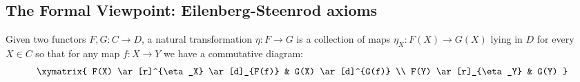 \subsection{The Formal Viewpoint: Eilenberg-Steenrod axioms}
\begin{defn}\label{defn-natural-transformation}
	Given two functors $F, G : C \to D$, a natural transformation $\eta : F \to G$ is a collection of maps $\eta_X : F(X) \to G(X)$ lying in $D$ for every $X \in C$ so that for any map $f : X \to Y$ we have a commutative diagram:
	\begin{align*}
		\xymatrix{
		F(X) \ar[r]^{\eta_X} \ar[d]_{F(f)} & G(X) \ar[d]^{G(f)} \\
		F(Y) \ar[r]_{\eta_Y}               & G(Y)
		}
	\end{align*}
\end{defn}

